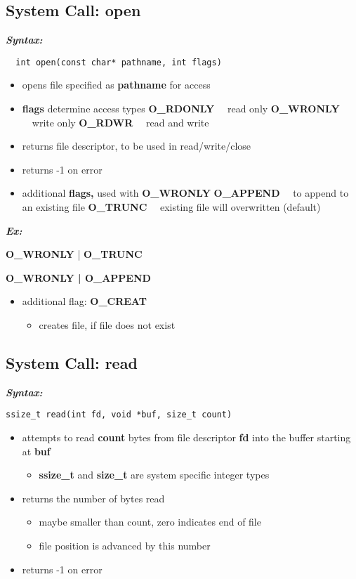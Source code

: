 \documentclass{report}
\begin{document}
  \subsection{System Call: open}
  \bigbreak \noindent
  \textbf{\textit{Syntax:}}
  \begin{verbatim}
  int open(const char* pathname, int flags)
  \end{verbatim} 
  \begin{itemize}
    \item opens file specified as \textbf{pathname} for access
    \item \textbf{flags} determine access types
      \subitem\textbf{O\_RDONLY} \ \ read only
      \subitem \textbf{O\_WRONLY} \ \ write only
      \subitem \textbf{O\_RDWR} \ \ read and write
    \item returns file descriptor, to be used in read/write/close
    \item returns -1 on error
      \bigbreak \noindent
    \item additional \textbf{flags,} used with \textbf{O_WRONLY}
        \subitem \textbf{O\_APPEND} \ \ to append to an existing file
        \subitem \textbf{O\_TRUNC} \ \ existing file will overwritten (default)
  \end{itemize}
  \textit{\textbf{Ex:}}

  \textbf{O\_WRONLY} | \textbf{O\_TRUNC} \vspace{1.5mm}
    
    \textbf{O\_WRONLY | O\_APPEND}
    \begin{itemize}
      \item additional flag: \textbf{O\_CREAT}
        \begin{itemize}[label=$\circ$]
          \item creates file, if file does not exist
        \end{itemize}
    \end{itemize}
\subsection{System Call: read}
\bigbreak \noindent
\textbf{\textit{Syntax:}}
\begin{verbatim}
ssize_t read(int fd, void *buf, size_t count)
\end{verbatim}
\begin{itemize}
  \item attempts to read \textbf{count} bytes from file descriptor \textbf{fd} into the buffer starting at \textbf{buf}
    \begin{itemize}[label=$\circ$]
      \item \textbf{ssize\_t} and \textbf{size\_t} are system specific integer types
    \end{itemize}
  \item returns the number of bytes read
    \begin{itemize}[label=$\circ$]
      \item maybe smaller than count, zero indicates end of file
      \item file position is advanced by this number
    \end{itemize}
  \item returns -1 on error
\end{itemize}
\end{document}
